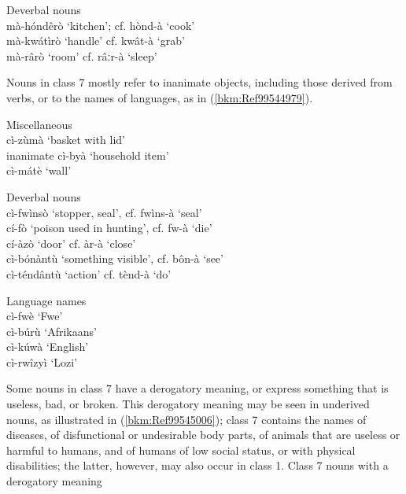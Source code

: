 \ex
  Deverbal nouns \\
  mà-hóndêrò    ‘kitchen’; cf. hònd-à ‘cook’ \\
      mà-kwátìrò    ‘handle’ cf. kwât-à ‘grab’ \\
      mà-rârò    ‘room’ cf. râːr-à ‘sleep’
\z\z

Nouns in class 7 mostly refer to inanimate objects, including those derived from verbs, or to the names of languages, as in (\ref{bkm:Ref99544979}).

\ea
\label{bkm:Ref99544979}

\ea
  Miscellaneous \\
  cì-zùmà  ‘basket with lid’\\
inanimate     cì-byà    ‘household item’\\
      cì-mátè  ‘wall’

\ex
  Deverbal nouns \\
  cì-fwìnsò  ‘stopper, seal’, cf. fwìns-à ‘seal’\\
      cí-fò    ‘poison used in hunting’, cf. fw-à ‘die’\\
      cí-àzò    ‘door’ cf. àr-à ‘close’\\
      cì-bónàntù  ‘something visible’, cf. bôn-à ‘see’\\
      cì-téndântù  ‘action’ cf. tènd-à ‘do’

\ex
  Language names \\  cì-fwè    ‘Fwe’\\
      cì-búrù  ‘Afrikaans’\\
      cì-kúwà  ‘English’\\
      cì-rwîzyì  ‘Lozi’
\z\z

Some nouns in class 7 have a derogatory meaning, or express something that is useless, bad, or broken. This derogatory meaning may be seen in underived nouns, as illustrated in (\ref{bkm:Ref99545006}); class 7 contains the names of diseases, of disfunctional or undesirable body parts, of animals that are useless or harmful to humans, and of humans of low social status, or with physical disabilities; the latter, however, may also occur in class 1.
\ea
\label{bkm:Ref99545006}
  Class 7 nouns with a derogatory meaning

